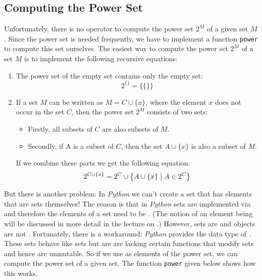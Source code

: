 \subsection{Computing the Power Set}\label{computing-the-power-set}
Unfortunately, there is no operator to compute the power set \(2^M\) of
a given set \(M\). Since the power set is needed frequently, we have to
implement a function \texttt{power} to compute this set ourselves. The easiest
way to compute the power set \(2^M\) of a set \(M\) is to implement the
following recursive equations:
\begin{enumerate}
\item The power set of the empty set contains only the empty set:
    $$2^{\{\}} = \bigl\{\{\}\bigr\}$$
\item If a set $M$ can be written as $M = C \cup \{x\}$, where the element $x$ does not occur in the set $C$, then the power set $2^M$ consists of two sets:
      \begin{itemize}
        \item Firstly, all subsets of $C$ are also subsets of $M$.
        \item Secondly, if A is a subset of $C$, then the set $A \cup\{x\}$ is also a subset of $M$.
      \end{itemize}
    If we combine these parts we get the following equation:
    $$2^{C \cup \{x\}} = 2^C \cup \bigl\{ A \cup \{x\} \bigm| A \in 2^C \bigr\}$$
\end{enumerate}
But there is another problem: In \textsl{Python} we can't create a set
that has elements that are sets themselves! The reason is that in
\textsl{Python} sets are implemented via  and therefore
the elements of a set need to be . (The notion of an
element being  will be discussed in more detail in the
lecture on .) However, sets are  and
 objects are not . Fortunately, there is a
workaround: \textsl{Python} provides the data type of .
These sets behave like sets but are are lacking certain functions that modify sets and
hence are unmutable. So if we use  as elements of the
power set, we can compute the power set of a given set. The function
\texttt{power} given below shows how this works.

